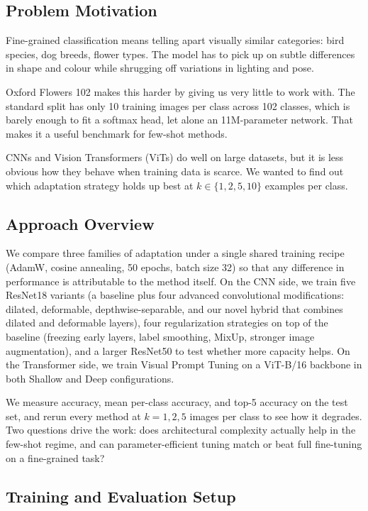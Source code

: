 \subsection{Problem Motivation}

Fine-grained classification means telling apart visually similar categories: bird species, dog breeds, flower types. The model has to pick up on subtle differences in shape and colour while shrugging off variations in lighting and pose.

Oxford Flowers 102 \citep{nilsback2008} makes this harder by giving us very little to work with. The standard split has only 10 training images per class across 102 classes, which is barely enough to fit a softmax head, let alone an 11M-parameter network. That makes it a useful benchmark for few-shot methods.

CNNs and Vision Transformers (ViTs) do well on large datasets, but it is less obvious how they behave when training data is scarce. We wanted to find out which adaptation strategy holds up best at $k \in \{1, 2, 5, 10\}$ examples per class.

\subsection{Approach Overview}

We compare three families of adaptation under a single shared training recipe (AdamW, cosine annealing, 50 epochs, batch size 32) so that any difference in performance is attributable to the method itself. On the CNN side, we train five ResNet18 variants (a baseline plus four advanced convolutional modifications: dilated, deformable, depthwise-separable, and our novel hybrid that combines dilated and deformable layers), four regularization strategies on top of the baseline (freezing early layers, label smoothing, MixUp, stronger image augmentation), and a larger ResNet50 to test whether more capacity helps. On the Transformer side, we train Visual Prompt Tuning \citep{jia2022vpt} on a ViT-B/16 backbone in both Shallow and Deep configurations.

We measure accuracy, mean per-class accuracy, and top-5 accuracy on the test set, and rerun every method at $k = 1, 2, 5$ images per class to see how it degrades. Two questions drive the work: does architectural complexity actually help in the few-shot regime, and can parameter-efficient tuning match or beat full fine-tuning on a fine-grained task?

\subsection{Training and Evaluation Setup}

